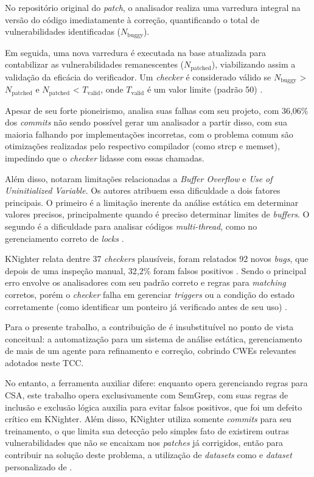 \documentclass[
    12pt,                %
    openright,           %
    oneside,             %
    a4paper,             %
    english,             %
    brazil               %
]{abntex2}
\begin{document}
No repositório original do \textit{patch}, o analisador realiza uma varredura integral na versão do código imediatamente à correção, quantificando o total de vulnerabilidades identificadas ($N_{\text{buggy}}$).
\par
Em seguida, uma nova varredura é executada na base atualizada para contabilizar as vulnerabilidades remanescentes ($N_{\text{patched}}$), viabilizando assim a validação da eficácia do verificador.
Um \textit{checker} é considerado válido se $N_{\text{buggy}}$ > $N_{\text{patched}}$ e $N_{\text{patched}}$ < $T_{\text{valid}}$, onde $T_{\text{valid}}$ é um valor limite (padrão 50) \cite{yang2025knighter}.
\par 
Apesar de seu forte pioneirismo,  analisa suas falhas com seu projeto, com 36,06\% dos \textit{commits} não sendo possível gerar um analisador a partir disso, com sua maioria falhando por implementações incorretas, com o problema comum são otimizações realizadas pelo respectivo compilador (como strcp e memset), impedindo que o \textit{checker} lidasse com essas chamadas.
\par
Além disso, notaram limitações relacionadas a \textit{Buffer Overflow} e \textit{Use of Uninitialized Variable}.
Os autores atribuem essa dificuldade a dois fatores principais.
O primeiro é a limitação inerente da análise estática em determinar valores precisos, principalmente quando é preciso determinar limites de \textit{buffers}.
O segundo é a dificuldade para analisar códigos \textit{multi-thread}, como no gerenciamento correto de \textit{locks} \cite{yang2025knighter}. 
\par 
KNighter relata dentre 37 \textit{checkers} plausíveis, foram relatados 92 novos \textit{bugs}, que depois de uma inspeção manual, 32,2\% foram falsos positivos \cite{yang2025knighter}.
Sendo o principal erro envolve os analisadores com seu padrão correto e regras para \textit{matching} corretos, porém o \textit{checker} falha em gerenciar \textit{triggers} ou a condição do estado corretamente (como identificar um ponteiro já verificado antes de seu uso) \cite{yang2025knighter}.
\par
Para o presente trabalho, a contribuição de  é insubstituível no ponto de vista conceitual: a automatização para um sistema de análise estática, gerenciamento de mais de um agente para refinamento e correção, cobrindo CWEs relevantes adotados neste TCC.
\par
No entanto, a ferramenta auxiliar difere: enquanto  opera gerenciando regras para CSA, este trabalho opera exclusivamente com SemGrep, com suas regras de inclusão e exclusão lógica auxilia para evitar falsos positivos, que foi um defeito crítico em KNighter.
Além disso, KNighter utiliza somente \textit{commits} para seu treinamento, o que limita sua detecção pelo simples fato de existirem outras vulnerabilidades que não se encaixam nos \textit{patches} já corrigidos, então para contribuir na solução deste problema, a utilização de \textit{datasets} como  e \textit{dataset} personalizado de . 
\end{document}
